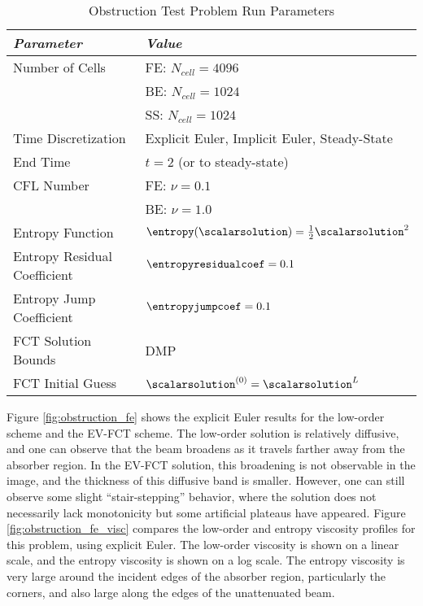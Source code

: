 \begin{table}[htb]\caption{Obstruction Test Problem Run Parameters}
\label{tab:obstruction_run}
\centering
\begin{tabular}{l l}\toprule
\emph{Parameter} & \emph{Value}\\\midrule
Number of Cells & FE: $N_{cell} = 4096$\\
                & BE: $N_{cell} = 1024$\\
                & SS: $N_{cell} = 1024$\\
Time Discretization & Explicit Euler, Implicit Euler, Steady-State\\
End Time & $t = 2$ (or to steady-state)\\
CFL Number & FE: $\nu = 0.1$\\
           & BE: $\nu = 1.0$\\
\midrule
Entropy Function & $\entropy(\scalarsolution) = \frac{1}{2}\scalarsolution^2$\\
Entropy Residual Coefficient & $\entropyresidualcoef = 0.1$\\
Entropy Jump Coefficient & $\entropyjumpcoef = 0.1$\\\midrule
FCT Solution Bounds & DMP\\
FCT Initial Guess & $\scalarsolution^{(0)} = \scalarsolution^{L}$\\
\bottomrule\end{tabular}
\end{table}

Figure \ref{fig:obstruction_fe} shows the explicit Euler results for the
low-order scheme and the EV-FCT scheme. The low-order solution
is relatively diffusive, and one can observe that the beam broadens as it
travels farther away from the absorber region. In the EV-FCT solution, this
broadening is not observable in the image, and the thickness of this
diffusive band is smaller. However, one can still observe some slight
``stair-stepping'' behavior, where the solution does not necessarily
lack monotonicity but some artificial plateaus have appeared.
Figure \ref{fig:obstruction_fe_visc} compares the low-order and entropy
viscosity profiles for this problem, using explicit Euler. The low-order
viscosity is shown on a linear scale, and the entropy viscosity is shown
on a log scale. The entropy viscosity is very large around the incident
edges of the absorber region, particularly the corners, and also
large along the edges of the unattenuated beam.

